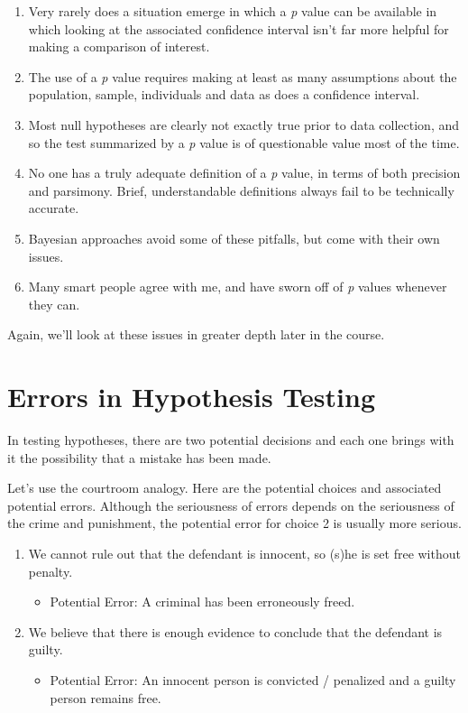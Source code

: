 \documentclass[
]{book}
\providecommand{\tightlist}{%
  \setlength{\itemsep}{0pt}\setlength{\parskip}{0pt}}
\begin{document}
\begin{enumerate}
\def\labelenumi{\arabic{enumi}.}
\tightlist
\item
  Very rarely does a situation emerge in which a \emph{p} value can be available in which looking at the associated confidence interval isn't far more helpful for making a comparison of interest.
\item
  The use of a \emph{p} value requires making at least as many assumptions about the population, sample, individuals and data as does a confidence interval.
\item
  Most null hypotheses are clearly not exactly true prior to data collection, and so the test summarized by a \emph{p} value is of questionable value most of the time.
\item
  No one has a truly adequate definition of a \emph{p} value, in terms of both precision and parsimony. Brief, understandable definitions always fail to be technically accurate.
\item
  Bayesian approaches avoid some of these pitfalls, but come with their own issues.
\item
  Many smart people agree with me, and have sworn off of \emph{p} values whenever they can.
\end{enumerate}

Again, we'll look at these issues in greater depth later in the course.

\hypertarget{errors-in-hypothesis-testing}{%
\section{Errors in Hypothesis Testing}\label{errors-in-hypothesis-testing}}

In testing hypotheses, there are two potential decisions and each one brings with it the possibility that a mistake has been made.

Let's use the courtroom analogy. Here are the potential choices and associated potential errors. Although the seriousness of errors depends on the seriousness of the crime and punishment, the potential error for choice 2 is usually more serious.

\begin{enumerate}
\def\labelenumi{\arabic{enumi}.}
\tightlist
\item
  We cannot rule out that the defendant is innocent, so (s)he is set free without penalty.

  \begin{itemize}
  \tightlist
  \item
    Potential Error: A criminal has been erroneously freed.
  \end{itemize}
\item
  We believe that there is enough evidence to conclude that the defendant is guilty.

  \begin{itemize}
  \tightlist
  \item
    Potential Error: An innocent person is convicted / penalized and a guilty person remains free.
  \end{itemize}
\end{enumerate}
\end{document}
